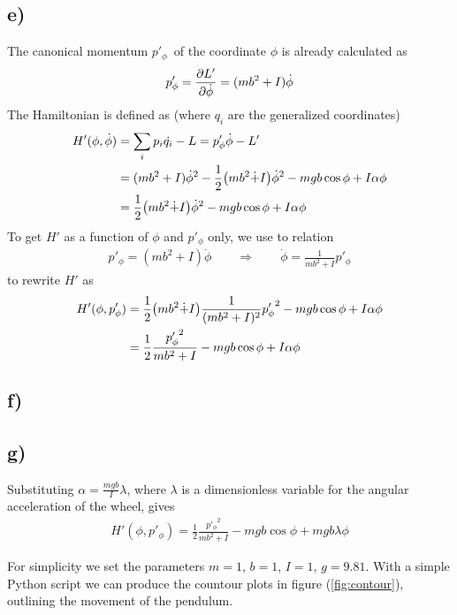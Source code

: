 \documentclass[12p,a4paper]{article}
\newcommand{\half}{\frac{1}{2}}
\begin{document}
\subsection*{e)}
The canonical momentum $p'_\phi$ of the coordinate $\phi$ is already calculated as
\begin{align*}
    p'_\phi = \pdv{L'}{\dot{\phi}} = (mb^2 + I)\dot{\phi}
\end{align*}
The Hamiltonian is defined as (where $q_i$ are the generalized coordinates)
\begin{align*}
    H'(\phi, \dot{\phi}) &= \sum_i p_i \dot{q_i} - L = p'_\phi \dot{\phi} - L' \\
    &= (mb^2 + I)\dot{\phi}^2 - \half \qty(m b^2\dot + I)\dot{\phi}^2 - mgb\cos{\phi} + I\alpha\phi \\
    &= \half \qty(m b^2\dot + I)\dot{\phi}^2 - mgb\cos{\phi} + I\alpha\phi
\end{align*}
To get $H'$ as a function of $\phi$ and $p'_\phi$ only, we use to relation
\begin{align*}
    p'_\phi = (mb^2 + I)\dot{\phi} \quad\quad \Rightarrow \quad\quad
    \dot{\phi} = \frac{1}{mb^2 + I}p'_\phi
\end{align*}
to rewrite $H'$ as
\begin{align*}
    H'(\phi, p'_\phi) &= \half \qty(m b^2\dot + I)\frac{1}{(mb^2 + I)^2}{p'_\phi}^2 - mgb\cos{\phi} + I\alpha\phi \\
    &= \half \frac{{p'_\phi}^2}{mb^2 + I} - mgb\cos{\phi} + I\alpha\phi \\
\end{align*}

\subsection*{f)}


\subsection*{g)}

Substituting $\alpha = \frac{mgb}{I}\lambda$, where $\lambda$ is a dimensionless variable for the angular acceleration of the wheel, gives 
\begin{align*}
    H'(\phi, p'_\phi) = \half \frac{{p'_\phi}^2}{mb^2 + I} - mgb\cos{\phi} + mgb\lambda\phi
\end{align*}

For simplicity we set the parameters $m = 1$, $b = 1$, $I = 1$, $g = 9.81$. With a simple Python script we can produce the countour plots in figure (\ref{fig:contour}), outlining the movement of the pendulum.
\end{document}
